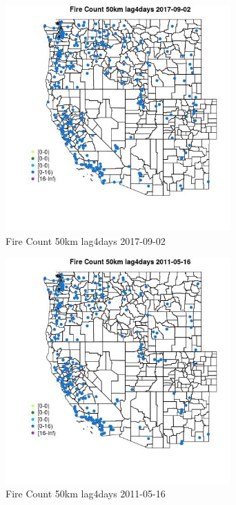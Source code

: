 \begin{figure} 
\centering  
\includegraphics[width=0.77\textwidth]{Code_Outputs/Report_ML_input_PM25_Step4_part_e_de_duplicated_aves_compiled_2019-05-21wNAs_MapObsFire_Count_50km_lag4days2017-09-02.jpg} 
\caption{\label{fig:Report_ML_input_PM25_Step4_part_e_de_duplicated_aves_compiled_2019-05-21wNAsMapObsFire_Count_50km_lag4days2017-09-02}Fire Count 50km lag4days 2017-09-02} 
\end{figure} 
 

\begin{figure} 
\centering  
\includegraphics[width=0.77\textwidth]{Code_Outputs/Report_ML_input_PM25_Step4_part_e_de_duplicated_aves_compiled_2019-05-21wNAs_MapObsFire_Count_50km_lag4days2011-05-16.jpg} 
\caption{\label{fig:Report_ML_input_PM25_Step4_part_e_de_duplicated_aves_compiled_2019-05-21wNAsMapObsFire_Count_50km_lag4days2011-05-16}Fire Count 50km lag4days 2011-05-16} 
\end{figure} 
 

